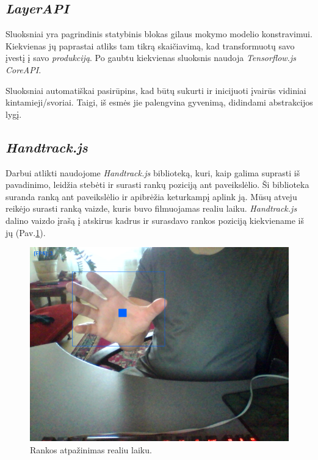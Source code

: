 \documentclass{VUMIFInfKursinis}
\begin{document}
\subsection{\textit{LayerAPI}}
\vspace{10mm}

Sluoksniai yra pagrindinis statybinis blokas gilaus mokymo modelio konstravimui. Kiekvienas jų paprastai atliks tam tikrą skaičiavimą, kad transformuotų savo įvestį į savo \textit{produkciją}. Po gaubtu kiekvienas sluoksnis naudoja \textit{Tensorflow.js} \textit{CoreAPI}.
\par
Sluoksniai automatiškai pasirūpins, kad būtų sukurti ir inicijuoti įvairūs vidiniai kintamieji/svoriai. Taigi, iš esmės jie palengvina gyvenimą, didindami abstrakcijos lygį.\cite{12}

\subsection{\textit{Handtrack.js}}

Darbui atlikti naudojome \textit{Handtrack.js} biblioteką, kuri, kaip galima suprasti iš pavadinimo, leidžia stebėti ir surasti rankų poziciją ant paveikslėlio. Ši biblioteka suranda ranką ant paveikslėlio ir apibrėžia  keturkampį aplink ją. Mūsų atveju reikėjo surasti ranką vaizde, kuris buvo filmuojamas realiu laiku. \textit{Handtrack.js} dalino vaizdo įrašą į atskirus kadrus ir surasdavo rankos poziciją kiekviename iš jų (Pav.\ref{fig:handtrack}).

\newpage

\begin{figure}[h!]
\centering
  \includegraphics[scale=0.4]{img/handtrack.png}
  \caption{Rankos atpažinimas realiu laiku.}
  \label{fig:handtrack}
\end{figure}
\end{document}
